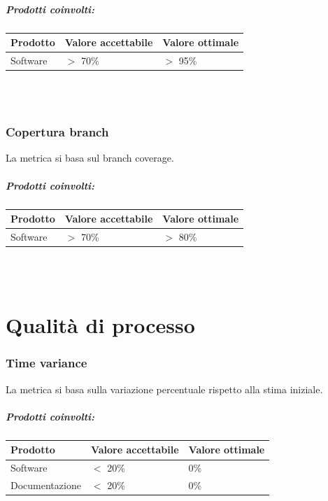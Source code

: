 \documentclass[a4paper, 12pt]{article}
\begin{document}
\subparagraph{Prodotti coinvolti:}
\begin{center}
	\begin{tabularx}{\textwidth}{|X|X|X|}
		\hline
		\textbf{Prodotto} & \textbf{Valore accettabile } & \textbf{Valore ottimale } \\
		\hline
		Software          & $>$ 70\%                     & $>$ 95\%                     \\
		\hline
	\end{tabularx}\\[8pt]
	\mbox{}\\
\end{center}
\subsubsection{Copertura branch}
La metrica si basa sul branch coverage.

\subparagraph{Prodotti coinvolti:}
\begin{center}
	\begin{tabularx}{\textwidth}{|X|X|X|}
		\hline
		\textbf{Prodotto} & \textbf{Valore accettabile } & \textbf{Valore ottimale } \\
		\hline
		Software          & $>$ 70\%                     & $>$ 80\%                     \\
		\hline
	\end{tabularx}\\[8pt]
	\mbox{}\\
\end{center}

\newpage
\section{Qualità di processo}
\subsubsection{Time variance}
La metrica si basa sulla variazione percentuale rispetto alla stima iniziale.

\subparagraph{Prodotti coinvolti:}
\begin{center}
	\begin{tabularx}{\textwidth}{|X|X|X|}
		\hline
		\textbf{Prodotto} & \textbf{Valore accettabile } & \textbf{Valore ottimale } \\
		\hline
		Software          & $<$ 20\%                     & 0\%                       \\
		\hline
		Documentazione    & $<$ 20\%                     & 0\%                       \\
		\hline
	\end{tabularx}\\[8pt]
	\mbox{}\\
\end{center}
\end{document}
